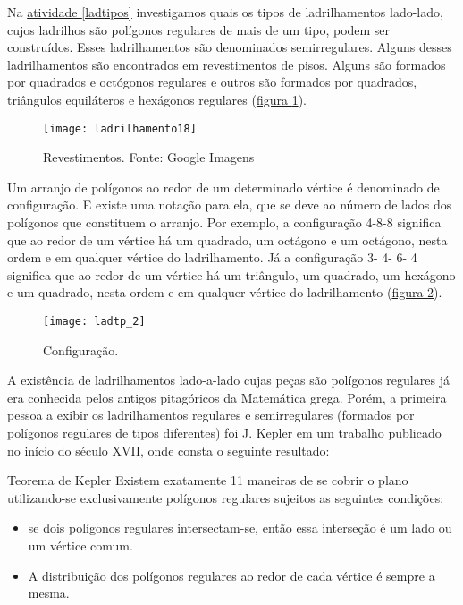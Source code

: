 
Na \hyperref[ladtipos]{atividade \ref{ladtipos}} investigamos  quais os tipos de ladrilhamentos lado-lado, cujos ladrilhos são polígonos regulares de mais de um tipo, podem ser construídos. Esses ladrilhamentos são denominados semirregulares. Alguns desses ladrilhamentos são encontrados em revestimentos de pisos. Alguns são formados por quadrados e octógonos regulares  e outros são formados por quadrados, triângulos equiláteros e hexágonos regulares (\hyperref[lad_tp1]{figura \ref{lad_tp1}}).


\begin{figure}[H]
\centering
\texttt{[image: ladrilhamento18]}
\caption{Revestimentos. Fonte: Google Imagens}
\label{lad_tp1}
\end{figure}

Um arranjo de polígonos ao redor de um determinado vértice é denominado de configuração. E existe uma notação para ela, que se deve ao número de lados dos polígonos que constituem o arranjo. Por exemplo, a configuração 4-8-8 significa que ao redor de um vértice há um quadrado, um octágono e um octágono, nesta ordem e em qualquer vértice do ladrilhamento. Já a configuração 3- 4- 6- 4 significa que ao redor de um vértice há um triângulo, um quadrado, um hexágono e um quadrado, nesta ordem e em qualquer vértice do ladrilhamento (\hyperref[lad_tp2]{figura \ref{lad_tp2}}).


\begin{figure}[H]
\centering
\texttt{[image: ladtp\_2]}
\caption{Configuração.}
\label{lad_tp2}
\end{figure}

A existência de ladrilhamentos lado-a-lado cujas peças são polígonos regulares já era conhecida pelos antigos pitagóricos da Matemática grega. Porém, a primeira pessoa a exibir os ladrilhamentos regulares e semirregulares (formados por polígonos regulares de tipos diferentes) foi J. Kepler em um trabalho publicado no início do século XVII, onde consta o seguinte resultado:

\begin{observation}{Teorema de Kepler}
Existem exatamente 11 maneiras de se cobrir o plano utilizando-se exclusivamente polígonos regulares sujeitos as seguintes condições:
\begin{itemize}
\item	se dois polígonos regulares intersectam-se, então essa interseção é um lado ou um vértice comum.
\item	A distribuição dos polígonos regulares ao redor de cada vértice é sempre a mesma.
\end{itemize}

\end{observation}



